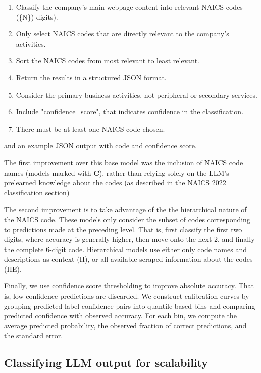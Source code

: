 \documentclass[fleqn,moreauthors,10pt]{ds_report}
\begin{document}
\begin{small}
\begin{enumerate}
\item Classify the company's main webpage content into relevant NAICS codes (\{N\}) digits).
\item Only select NAICS codes that are directly relevant to the company's activities.
\item Sort the NAICS codes from most relevant to least relevant.
\item Return the results in a structured JSON format.
\item Consider the primary business activities, not peripheral or secondary services.
\item Include "confidence\_score", that indicates confidence in the classification.
 \item There must be at least one NAICS code chosen.
\end{enumerate} 
\end{small}

\noindent and an example JSON output with code and confidence score.

The first improvement over this base model was the inclusion of NAICS code names (models marked with \textbf{C}), rather than relying solely on the LLM’s prelearned knowledge about the codes (as described in the NAICS 2022 classification section)

The second improvement is to take advantage of the the hierarchical nature of the NAICS code. These models only consider the subset of codes corresponding to predictions made at the preceding level. That is, first classify the first two digits, where accuracy is generally higher, then move onto the next 2, and finally the complete 6-digit code. Hierarchical models use either only code names and descriptions as context (H), or all available scraped information about the codes (HE).

Finally, we use confidence score thresholding to improve absolute accuracy. That is, low confidence predictions are discarded. We construct calibration curves by grouping predicted label-confidence pairs into quantile-based bins and comparing predicted confidence with observed accuracy. For each bin, we compute the average predicted probability, the observed fraction of correct predictions, and the standard error.

\subsection*{Classifying LLM output for scalability}
\end{document}

